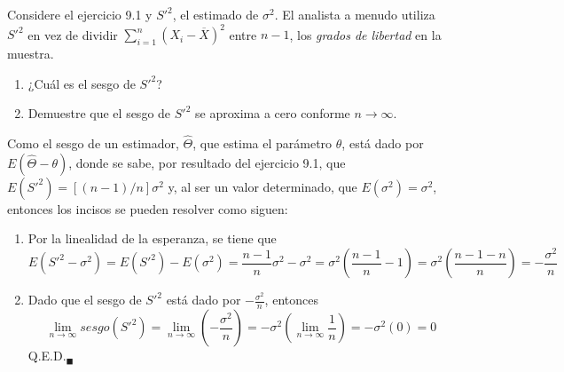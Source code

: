 \begin{enunciado}
 Considere el ejercicio 9.1 y $S'^2$, el estimado de $\sigma^2$. El analista a menudo utiliza $S'^2$ en vez de dividir $\displaystyle{ \sum_{i=1}^n \left( X_i - \overline{X} \right)^2 }$ entre $n-1$, los \textit{grados de libertad} en la muestra.
 \begin{enumerate}
  \item ¿Cu\'al es el sesgo de $S'^2$?
  \item Demuestre que el sesgo de $S'^2$ se aproxima a cero conforme $n \to \infty$.
 \end{enumerate}
\end{enunciado}

\begin{solucion}
 Como el sesgo de un estimador, $\widehat{ \Theta }$, que estima el par\'ametro $\theta$, est\'a dado por $E\left( \widehat{ \Theta } - \theta \right)$, donde se sabe, por resultado del ejercicio 9.1, que $E\left( S'^2 \right) = \left[ (n-1)/n \right]\sigma^2$ y, al ser un valor determinado, que $E(\sigma^2)=\sigma^2$, entonces los incisos se pueden resolver como siguen:
 \begin{enumerate}
  \item Por la linealidad de la esperanza, se tiene que
  \begin{equation*}
   E\left( S'^2 - \sigma^2 \right) = E\left( S'^2 \right) - E(\sigma^2) = \frac{n-1}{n}\sigma^2 - \sigma^2 = \sigma^2\left( \frac{n-1}{n} - 1 \right) = \sigma^2\left( \frac{n-1-n}{n}  \right) = -\frac{\sigma^2}{n}
  \end{equation*}

  \item Dado que el sesgo de $S'^2$ est\'a dado por $-\frac{\sigma^2}{n}$, entonces
  \begin{equation*}
   \lim_{n\to\infty} sesgo\left(S'^2\right) = \lim_{n\to\infty} \left( -\frac{\sigma^2}{n} \right) = -\sigma^2 \left( \lim_{n\to\infty} \frac{1}{n} \right) = -\sigma^2 (0) = 0
  \end{equation*}
  Q.E.D.${}_{\blacksquare}$
 \end{enumerate}
\end{solucion}
